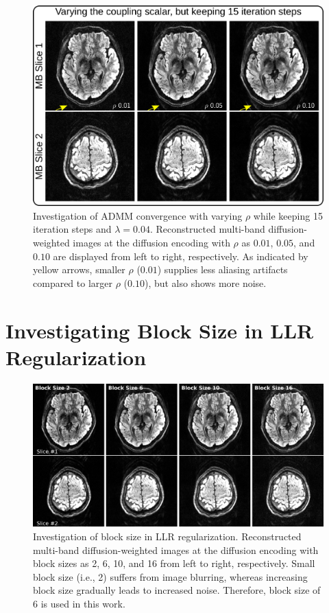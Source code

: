 \documentclass[preprint,12pt,authoryear,review]{elsarticle}
\begin{document}
	\begin{figure}[h!]
		\centering
		\includegraphics[width=\textwidth]{../figures/supp_fig2.png}
		\caption{Investigation of ADMM convergence with varying $\rho$
			while keeping 15 iteration steps and $\lambda = 0.04$.
			Reconstructed multi-band diffusion-weighted images at the  diffusion encoding
			with $\rho$ as $0.01$, $0.05$, and $0.10$ are displayed from left to right, respectively.
			As indicated by yellow arrows, smaller $\rho$ ($0.01$) supplies less aliasing artifacts
			compared to larger $\rho$ ($0.10$), but also shows more noise.}
		\label{FIG:conv_rho}
	\end{figure}

	\clearpage

	\section{Investigating Block Size in LLR Regularization}

	\begin{figure}[h!]
		\centering
		\includegraphics[width=\textwidth]{../figures/supp_fig3.png}
		\caption{Investigation of block size in LLR regularization.
			Reconstructed multi-band diffusion-weighted images
			at the  diffusion encoding with block sizes as 2, 6, 10, and 16
			from left to right, respectively.
			Small block size (i.e., 2) suffers from image blurring,
			whereas increasing block size gradually leads to increased noise.
			Therefore, block size of 6 is used in this work.}
		\label{FIG:blocks}
	\end{figure}
\end{document}
